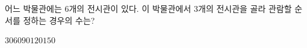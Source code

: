 어느 박물관에는 6개의 전시관이 있다. 이 박물관에서 3개의 전시관을 골라 관람할 순서를 정하는 경우의 수는?
\begin{choices32}{$30$}{$60$}{$90$}{$120$}{$150$}\end{choices32}
